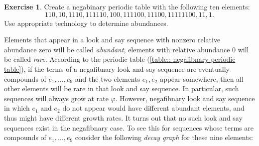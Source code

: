 \documentclass[reqno]{amsart}
\theoremstyle{definition}
\newtheorem{exercise}[theorem]{Exercise}
\begin{document}
\begin{exercise}\label{exercise::negabinary periodic table}
    Create a negabinary periodic table with the following ten elements:
    \begin{equation*}
        110, 10, 1110, 111110, 100, 111100, 11100, 11111100, 11, 1.
    \end{equation*}
    Use appropriate technology to determine abundances.
\end{exercise}

Elements that appear in a look and say sequence with nonzero relative abundance zero will be called \emph{abundant}, elements with relative abundance 0 will be called \emph{rare}. According to the periodic table (\ref{table:: negafibnary periodic table}), if the terms of a negafibnary look and say sequence are eventually compounds of $e_1,\ldots,e_9$ and the two elements $e_1,e_2$ appear somewhere, then all other elements will be rare in that look and say sequence. In particular, such sequences will always grow at rate $\varphi$. However, negafibnary look and say sequence in which $e_1$ and $e_2$ do not appear would have different abundant elements, and thus might have different growth rates. It turns out that no such look and say sequences exist in the negafibnary case. To see this for sequences whose terms are compounds of $e_1,\ldots,e_9$ consider the following \emph{decay graph} for these nine elements:
\end{document}
